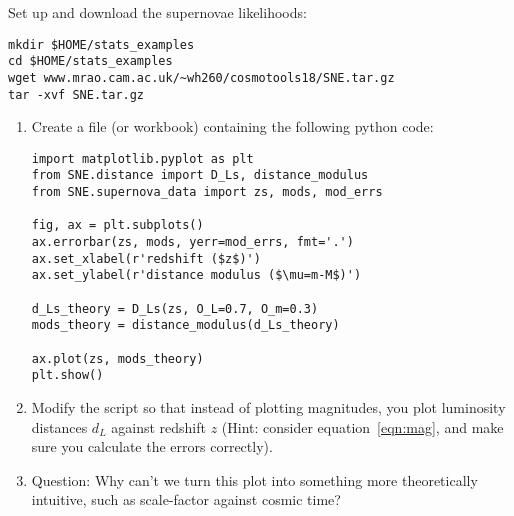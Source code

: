 \documentclass{article}
\begin{document}
Set up and download the supernovae likelihoods:
\begin{verbatim}
mkdir $HOME/stats_examples
cd $HOME/stats_examples
wget www.mrao.cam.ac.uk/~wh260/cosmotools18/SNE.tar.gz
tar -xvf SNE.tar.gz
\end{verbatim}
\begin{enumerate}
\item Create a file (or workbook) containing the following python code:
\begin{verbatim}
import matplotlib.pyplot as plt
from SNE.distance import D_Ls, distance_modulus
from SNE.supernova_data import zs, mods, mod_errs

fig, ax = plt.subplots()
ax.errorbar(zs, mods, yerr=mod_errs, fmt='.')
ax.set_xlabel(r'redshift ($z$)')
ax.set_ylabel(r'distance modulus ($\mu=m-M$)')

d_Ls_theory = D_Ls(zs, O_L=0.7, O_m=0.3)
mods_theory = distance_modulus(d_Ls_theory)

ax.plot(zs, mods_theory)
plt.show()
\end{verbatim}
    \item Modify the script so that instead of plotting magnitudes, you plot luminosity distances $d_L$ against redshift $z$ (Hint: consider equation~\eqref{eqn:mag}, and make sure you calculate the errors correctly).
    \item Question: Why can't we turn this plot into something more theoretically intuitive, such as scale-factor against cosmic time?
\end{enumerate}
\end{document}
